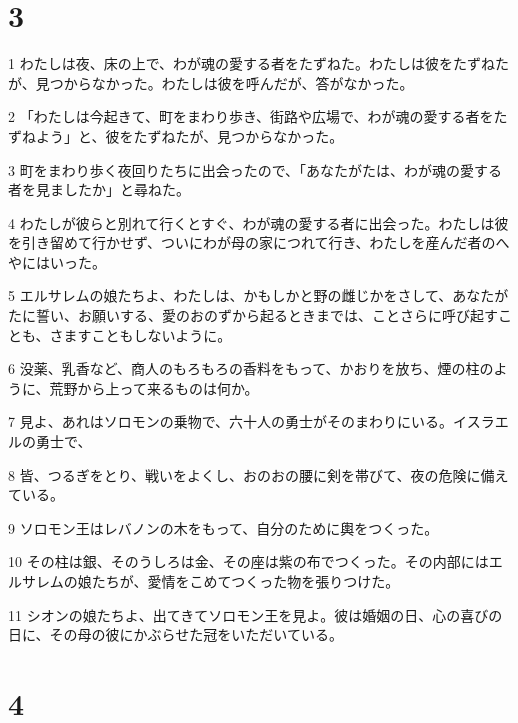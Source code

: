 \chapter{3}

\par 1 わたしは夜、床の上で、わが魂の愛する者をたずねた。わたしは彼をたずねたが、見つからなかった。わたしは彼を呼んだが、答がなかった。
\par 2 「わたしは今起きて、町をまわり歩き、街路や広場で、わが魂の愛する者をたずねよう」と、彼をたずねたが、見つからなかった。
\par 3 町をまわり歩く夜回りたちに出会ったので、「あなたがたは、わが魂の愛する者を見ましたか」と尋ねた。
\par 4 わたしが彼らと別れて行くとすぐ、わが魂の愛する者に出会った。わたしは彼を引き留めて行かせず、ついにわが母の家につれて行き、わたしを産んだ者のへやにはいった。
\par 5 エルサレムの娘たちよ、わたしは、かもしかと野の雌じかをさして、あなたがたに誓い、お願いする、愛のおのずから起るときまでは、ことさらに呼び起すことも、さますこともしないように。
\par 6 没薬、乳香など、商人のもろもろの香料をもって、かおりを放ち、煙の柱のように、荒野から上って来るものは何か。
\par 7 見よ、あれはソロモンの乗物で、六十人の勇士がそのまわりにいる。イスラエルの勇士で、
\par 8 皆、つるぎをとり、戦いをよくし、おのおの腰に剣を帯びて、夜の危険に備えている。
\par 9 ソロモン王はレバノンの木をもって、自分のために輿をつくった。
\par 10 その柱は銀、そのうしろは金、その座は紫の布でつくった。その内部にはエルサレムの娘たちが、愛情をこめてつくった物を張りつけた。
\par 11 シオンの娘たちよ、出てきてソロモン王を見よ。彼は婚姻の日、心の喜びの日に、その母の彼にかぶらせた冠をいただいている。

\chapter{4}


